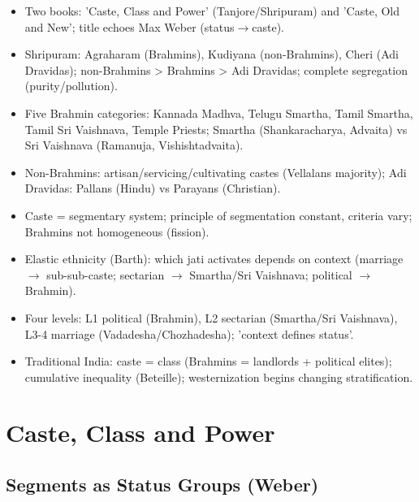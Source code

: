 \begin{QuickRevision}
\begin{itemize}
\item Two books: 'Caste, Class and Power' (Tanjore/Shripuram) and 'Caste, Old and New'; title echoes Max Weber (status$\rightarrow$caste).
\item Shripuram: Agraharam (Brahmins), Kudiyana (non-Brahmins), Cheri (Adi Dravidas); non-Brahmins > Brahmins > Adi Dravidas; complete segregation (purity/pollution).
\item Five Brahmin categories: Kannada Madhva, Telugu Smartha, Tamil Smartha, Tamil Sri Vaishnava, Temple Priests; Smartha (Shankaracharya, Advaita) vs Sri Vaishnava (Ramanuja, Vishishtadvaita).
\item Non-Brahmins: artisan/servicing/cultivating castes (Vellalans majority); Adi Dravidas: Pallans (Hindu) vs Parayans (Christian).
\item Caste = segmentary system; principle of segmentation constant, criteria vary; Brahmins not homogeneous (fission).
\item Elastic ethnicity (Barth): which jati activates depends on context (marriage $\rightarrow$ sub-sub-caste; sectarian $\rightarrow$ Smartha/Sri Vaishnava; political $\rightarrow$ Brahmin).
\item Four levels: L1 political (Brahmin), L2 sectarian (Smartha/Sri Vaishnava), L3-4 marriage (Vadadesha/Chozhadesha); 'context defines status'.
\item Traditional India: caste = class (Brahmins = landlords + political elites); cumulative inequality (Beteille); westernization begins changing stratification.
\end{itemize}
\end{QuickRevision}

\section{Caste, Class and Power}

\subsection{Segments as Status Groups (Weber)}

